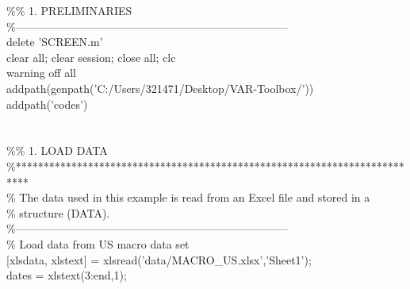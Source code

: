 \hspace{1mm}\textcolor{matlabgreen}{\%}\textcolor{matlabgreen}{\% 1. PRELIMINARIES }\\ 
\hspace{1mm}\textcolor{matlabgreen}{\%--------------------------------------------------------------------------  }\\ 
\hspace{1mm}delete \textcolor{matlabpurple}{'SCREEN.m'}  \\ 
\hspace{1mm}clear all; clear session; close all; clc \\ 
\hspace{1mm}warning off all \\ 
\hspace{1mm}addpath(genpath(\textcolor{matlabpurple}{'C:/Users/321471/Desktop/VAR-Toolbox/'})) \\ 
\hspace{1mm}addpath(\textcolor{matlabpurple}{'codes'}) \\ 
\hspace{1mm} \\ 
\hspace{1mm} \\ 
\hspace{1mm}\textcolor{matlabgreen}{\%}\textcolor{matlabgreen}{\% 1. LOAD DATA }\\ 
\hspace{1mm}\textcolor{matlabgreen}{\%**************************************************************************  }\\ 
\hspace{1mm}\textcolor{matlabgreen}{\% The data used in this example is read from an Excel file and stored in a }\\ 
\hspace{1mm}\textcolor{matlabgreen}{\% structure (DATA). }\\ 
\hspace{1mm}\textcolor{matlabgreen}{\%--------------------------------------------------------------------------  }\\ 
\hspace{1mm}\textcolor{matlabgreen}{\% Load data from US macro data set }\\ 
\hspace{1mm}[xlsdata, xlstext] = xlsread(\textcolor{matlabpurple}{'data/MACRO\_US.xlsx'},\textcolor{matlabpurple}{'Sheet1'}); \\ 
\hspace{1mm}dates = xlstext(3:end,1); \\ 
